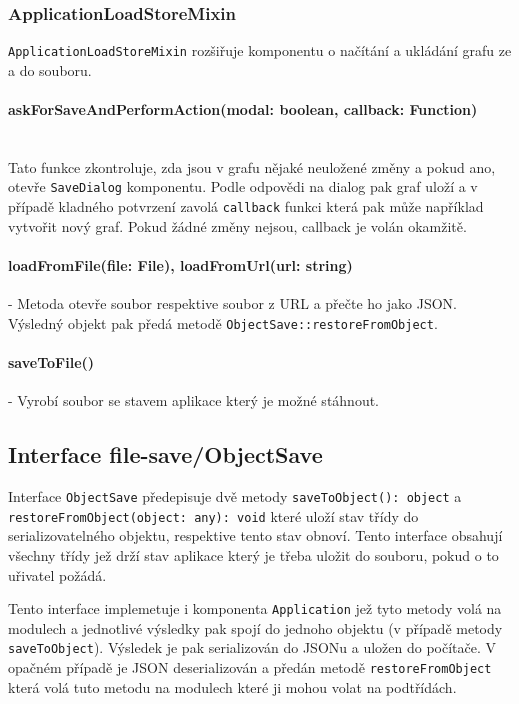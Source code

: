 \subsubsection{ApplicationLoadStoreMixin}
\texttt{ApplicationLoadStoreMixin} rozšiřuje komponentu o načítání a ukládání grafu ze a do souboru.

\paragraph{askForSaveAndPerformAction(modal: boolean, callback: Function)}\mbox{}\\ Tato funkce zkontroluje, zda jsou v grafu nějaké neuložené změny a pokud ano, otevře \texttt{SaveDialog} komponentu. Podle odpovědi na dialog pak graf uloží a v případě kladného potvrzení zavolá \texttt{callback} funkci která pak může například vytvořit nový graf. Pokud žádné změny nejsou, callback je volán okamžitě.

\paragraph{loadFromFile(file: File), loadFromUrl(url: string)} - Metoda otevře soubor respektive soubor z URL a přečte ho jako JSON. Výsledný objekt pak předá metodě \texttt{ObjectSave::restoreFromObject}.

\paragraph{saveToFile()} - Vyrobí soubor se stavem aplikace který je možné stáhnout.

\subsection{Interface file-save/ObjectSave}
Interface \texttt{ObjectSave} předepisuje dvě metody \texttt{saveToObject(): object} a \texttt{restoreFromObject(object: any): void} které uloží stav třídy do serializovatelného objektu, respektive tento stav obnoví. Tento interface obsahují všechny třídy jež drží stav aplikace který je třeba uložit do souboru, pokud o to uřivatel požádá.

Tento interface implemetuje i komponenta \texttt{Application} jež tyto metody volá na modulech a jednotlivé výsledky pak spojí do jednoho objektu (v případě metody \texttt{saveToObject}). Výsledek je pak serializován do JSONu a uložen do počítače. V opačném případě je JSON deserializován a předán metodě \texttt{restoreFromObject} která volá tuto metodu na modulech které ji mohou volat na podtřídách.

